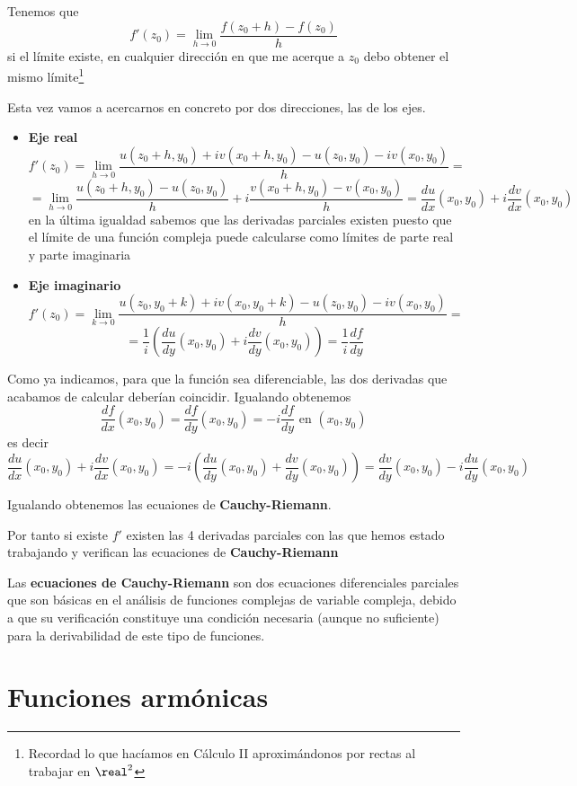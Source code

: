 \documentclass{apuntes}
\begin{document}
Tenemos que
\[f'(z_0)=\lim_{h \to 0} \frac{f(z_0+h)-f(z_0)}{h}\]
si el límite existe, en cualquier dirección en que me acerque a $z_0$ debo obtener el mismo límite\footnote{Recordad lo que hacíamos en Cálculo II aproximándonos por rectas al trabajar en $\real^2$}

Esta vez vamos a acercarnos en concreto por dos direcciones, las de los ejes.
\begin{itemize}
\item \textbf{Eje real}
\[f'(z_0)=\lim_{h \to 0} \frac{u(z_0+h,y_0)+iv(x_0+h,y_0)-u(z_0, y_0)-iv(x_0,y_0)}{h}=\]
\[= \lim_{h \to 0}\frac{u(z_0+h,y_0)-u(z_0, y_0)}{h}+i\frac{v(x_0+h,y_0)-v(x_0,y_0)}{h}=\frac{du}{dx}(x_0,y_0)+i\frac{dv}{dx}(x_0,y_0)\]
en la última igualdad sabemos que las derivadas parciales existen puesto que el límite de una función compleja puede calcularse como límites de parte real y parte imaginaria

\item \textbf{Eje imaginario}
\[f'(z_0)=\lim_{k \to 0} \frac{u(z_0,y_0+k)+iv(x_0,y_0+k)-u(z_0, y_0)-iv(x_0,y_0)}{h}=\]
\[=\frac{1}{i}\left(\frac{du}{dy}(x_0,y_0)+i \frac{dv}{dy}(x_0, y_0)\right)=\frac{1}{i}\frac{df}{dy}\]
\end{itemize}

Como ya indicamos, para que la función sea diferenciable, las dos derivadas que acabamos de calcular deberían coincidir. Igualando obtenemos
\[\frac{df}{dx}(x_0,y_0)=\frac{df}{dy}(x_0,y_0) = -i \frac{df}{dy} \text{ en } (x_0,y_0)\]
es decir
\[\frac{du}{dx}(x_0,y_0)+i\frac{dv}{dx}(x_0,y_0)=-i\left(\frac{du}{dy}(x_0,y_0)+\frac{dv}{dy}(x_0,y_0)\right)=\frac{dv}{dy}(x_0,y_0)-i\frac{du}{dy}(x_0,y_0)\]


Igualando obtenemos las ecuaiones de \textbf{Cauchy-Riemann}.

Por tanto si existe $f'$ existen las 4 derivadas parciales con las que hemos estado trabajando y verifican las ecuaciones de \textbf{Cauchy-Riemann}

\begin{defn}
Las \textbf{ecuaciones de Cauchy-Riemann} son dos ecuaciones diferenciales parciales que son básicas en el análisis de funciones complejas de variable compleja, debido a que su verificación constituye una condición necesaria (aunque no suficiente) para la derivabilidad de este tipo de funciones.
\end{defn}

\section{Funciones armónicas}
\end{document}
